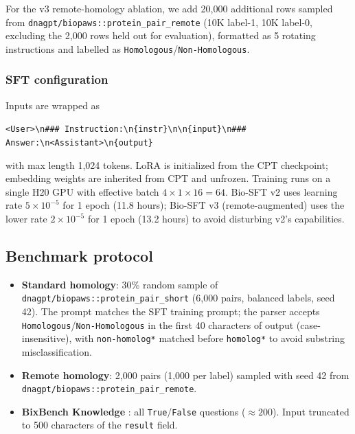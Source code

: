 \documentclass[11pt]{article}
\begin{document}
For the v3 remote-homology ablation, we add 20{,}000 additional rows sampled from \texttt{dnagpt/biopaws::protein\_pair\_remote} (10K label-1, 10K label-0, excluding the 2{,}000 rows held out for evaluation), formatted as 5 rotating instructions and labelled as \texttt{Homologous}/\texttt{Non-Homologous}.

\subsubsection{SFT configuration}

Inputs are wrapped as
\begin{center}
\texttt{<User>\textbackslash n\#\#\# Instruction:\textbackslash n\{instr\}\textbackslash n\textbackslash n\{input\}\textbackslash n\#\#\# Answer:\textbackslash n<Assistant>\textbackslash n\{output\}}
\end{center}
with max length 1{,}024 tokens. LoRA is initialized from the CPT checkpoint; embedding weights are inherited from CPT and unfrozen. Training runs on a single H20 GPU with effective batch $4 \times 1 \times 16 = 64$. Bio-SFT v2 uses learning rate $5 \times 10^{-5}$ for 1 epoch (11.8 hours); Bio-SFT v3 (remote-augmented) uses the lower rate $2 \times 10^{-5}$ for 1 epoch (13.2 hours) to avoid disturbing v2's capabilities.

\subsection{Benchmark protocol}
\label{sec:methods-benchmarks}

\begin{itemize}\setlength\itemsep{0pt}
\item \textbf{Standard homology}: 30\% random sample of \texttt{dnagpt/biopaws::protein\_pair\_short} (6{,}000 pairs, balanced labels, seed 42). The prompt matches the SFT training prompt; the parser accepts \texttt{Homologous}/\texttt{Non-Homologous} in the first 40 characters of output (case-insensitive), with \texttt{non-homolog*} matched before \texttt{homolog*} to avoid substring misclassification.
\item \textbf{Remote homology}: 2{,}000 pairs (1{,}000 per label) sampled with seed 42 from \texttt{dnagpt/biopaws::protein\_pair\_remote}.
\item \textbf{BixBench Knowledge} \citep{bixbench2024}: all \texttt{True}/\texttt{False} questions ($\approx 200$). Input truncated to 500 characters of the \texttt{result} field.
\end{itemize}
\end{document}
